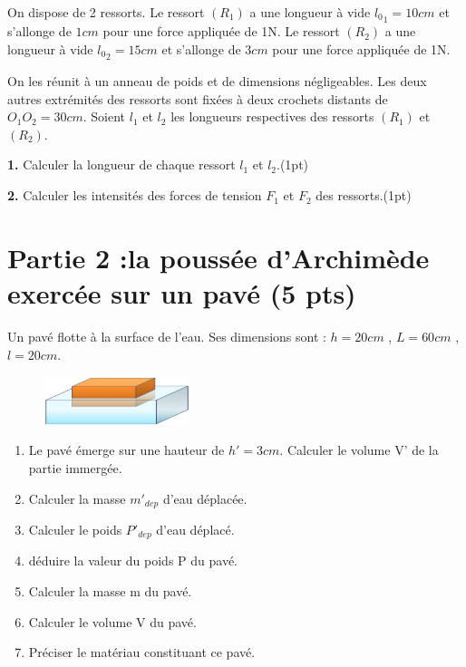 \documentclass[12pt]{article}
\begin{document}
On dispose de 2 ressorts. Le ressort $(R_1)$ a une longueur à
vide ${l_0}_1 = 10 cm$ et s’allonge de $1cm$ pour une force
appliquée de 1N. Le ressort $(R_2)$ a une longueur à vide
${l_0}_2=15cm$ et s’allonge de $3cm$ pour une force appliquée de 1N.

On les réunit à un anneau de poids et de dimensions
négligeables. Les deux autres extrémités des ressorts sont
fixées à deux crochets distants de $O_1O_2=30cm$. Soient $l_1$ et $l_2$ les longueurs respectives des ressorts $(R_1)$
et $(R_2)$.

\textbf{1.} Calculer la longueur de chaque ressort $l_1$ et $l_2$.\dotfill(1pt)

\textbf{2.} Calculer les intensités des forces de tension $F_1$ et $F_2$ des ressorts.\dotfill(1pt)


 \section*{Partie 2 :la poussée d'Archimède exercée sur un pavé \dotfill(5 pts)}
Un pavé flotte à la surface de l’eau. Ses dimensions sont : $h = 20 cm$ ,  $L = 60 cm$ ,  $l = 20 cm$.

\begin{figure}
	\vspace{-5.3cm}

	
 \begin{center}
	 \hspace{-3cm}	\includegraphics[width=0.38\textwidth]{./img/img01.png}
\end{center}
\end{figure}
\begin{enumerate}
	\item  Le pavé émerge sur une hauteur de $h' = 3 cm$. Calculer le volume V' de la partie immergée.

	\item  Calculer la masse $m'_{dep}$ d’eau déplacée.
	\item  Calculer le poids $P'_{dep}$ d’eau déplacé.
	\item  déduire la valeur du poids P du pavé.
	\item  Calculer la masse m du pavé.\dotfill{1pt}
	\item  Calculer le volume V du pavé.\dotfill{1pt}
	\item  Préciser le matériau constituant ce pavé.\dotfill{1pt}
\end{enumerate}
\end{document}
